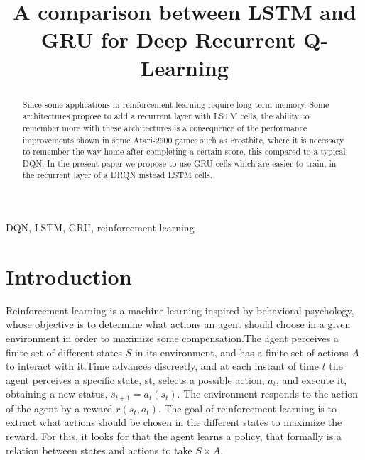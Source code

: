 \documentclass[conference]{IEEEtran}
\begin{document}
\title{A comparison between LSTM and GRU for Deep Recurrent Q-Learning}

\author{
\and
{}
}

\maketitle

\begin{abstract}
Since some applications in reinforcement learning require long term memory. Some architectures propose to add a recurrent layer with LSTM cells, the ability to remember more with these architectures is a consequence of the performance improvements shown in some Atari-2600 games such as Frostbite, where it is necessary to remember the way home after completing a certain score, this compared to a typical DQN. In the present paper we propose to use GRU cells which are easier to train, in the recurrent layer of a DRQN instead LSTM cells.
\end{abstract}


\begin{IEEEkeywords}
DQN, LSTM, GRU, reinforcement learning
\end{IEEEkeywords}

\section{Introduction}

Reinforcement learning is a machine learning inspired by behavioral psychology, whose objective is to determine what actions an agent should choose in a given environment in order to maximize some compensation.The agent perceives a finite set of different states $S$ in its environment, and has a finite set of actions $A$ to interact with it.Time advances discreetly, and at each instant of time $t$ the agent perceives a specific state, st, selects a possible action, $a_t$, and execute it, obtaining a new status, $s_{t+1} = a_t(s_t)$.
The environment responds to the action of the agent by a reward $r(s_t,a_t)$.
The goal of reinforcement learning is to extract what actions should be chosen in the different states to maximize the reward. For this, it looks for that the agent learns a policy, that formally is a relation between states and actions to take $S \times A$.
\end{document}
